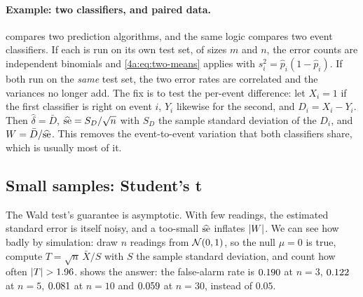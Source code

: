 \paragraph{Example: two classifiers, and paired data.}
 compares two prediction algorithms, and the same logic
compares two event classifiers. If each is run on its own test set, of sizes
$m$ and $n$, the error counts are independent binomials and
\eqref{4a:eq:two-means} applies with $s_i^2=\hat p_i(1-\hat p_i)$. If both run
on the \emph{same} test set, the two error rates are correlated and the
variances no longer add. The fix is to test the per-event difference: let
$X_i=1$ if the first classifier is right on event $i$, $Y_i$ likewise for the
second, and $D_i=X_i-Y_i$. Then $\hat\delta=\bar D$, $\widehat{\rm se}=S_D/\sqrt n$
with $S_D$ the sample standard deviation of the $D_i$, and $W=\bar D/\widehat{\rm se}$.
This  removes the event-to-event variation that both
classifiers share, which is usually most of it.

\subsection{Small samples: Student's t}
\label{4a:sec:t-test}

The Wald test's guarantee is asymptotic. With few readings, the estimated
standard error is itself noisy, and a too-small $\widehat{\rm se}$ inflates
$\left\lvert W\right\rvert$. We can see how badly by simulation: draw $n$ readings from
$\mathcal{N}(0,1)$, so the null $\mu=0$ is true, compute
$T=\sqrt n\,\bar X/S$ with $S$ the sample standard deviation, and count how
often $\left\lvert T\right\rvert>1.96$.  shows the answer: the false-alarm
rate is $0.190$ at $n=3$, $0.122$ at $n=5$,
$0.081$ at $n=10$ and $0.059$ at $n=30$, instead of
$0.05$.

